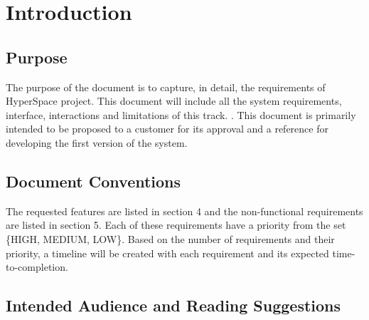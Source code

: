 \documentclass{scrreprt}
\begin{document}
\chapter{Introduction}

\section{Purpose}

The purpose of the document is to capture, in detail, the requirements of HyperSpace project. This document will include all the system requirements, interface, interactions and limitations of this track. . This document is primarily intended to be proposed to a customer for its approval
and a reference for developing the first version of the system.

\section{Document Conventions}

The requested features are listed in section 4 and the non-functional requirements are listed in section 5. Each of these requirements have a priority from the set \{HIGH, MEDIUM, LOW\}. Based on the number of requirements and their priority, a timeline will be created with each requirement and its expected time-to-completion.

\section{Intended Audience and Reading Suggestions}
\end{document}
